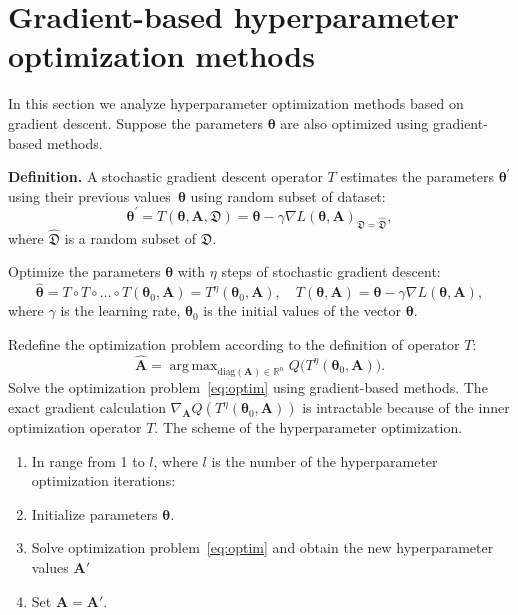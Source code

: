 \documentclass[12pt]{article}
\DeclareMathOperator*{\argmax}{arg\,max}
\begin{document}
\section{Gradient-based hyperparameter optimization methods}
In this section we analyze hyperparameter optimization methods based on gradient descent. Suppose the parameters $\boldsymbol{\theta}$ are also optimized using gradient-based methods. 

\textbf{Definition.} A stochastic gradient descent operator $T$ estimates the parameters $\boldsymbol{\theta}^\prime$ using their previous values~$\boldsymbol{\theta}$ using random subset of dataset:
\[
	\boldsymbol{\theta}^\prime = T(\boldsymbol{\theta}, \mathbf{A}, \mathfrak{D}) = \boldsymbol{\theta} - \gamma \nabla L(\boldsymbol{\theta}, \mathbf{A})_{\mathfrak{D} = \hat{\mathfrak{D}}},
\]
where $\hat{\mathfrak{D}}$ is a random subset of $\mathfrak{D}$.

Optimize the parameters  $\boldsymbol{\theta}$ with $\eta$ steps of stochastic gradient descent:
\begin{equation}
\label{eq:gd}
	 \hat{\boldsymbol{\theta}} = T \circ T \circ \dots \circ T(\boldsymbol{\theta}_0, \mathbf{A}) = T^\eta(\boldsymbol{\theta}_0, \mathbf{A}), \quad 	T(\boldsymbol{\theta}, \mathbf{A}) =\boldsymbol{\theta} - \gamma \nabla L(\boldsymbol{\theta}, \mathbf{A}), 
\end{equation}
where $\gamma$ is the learning rate, $\boldsymbol{\theta}_0$ is the initial values of the vector $\boldsymbol{\theta}$. 

Redefine the optimization problem according to the definition of operator $T$:
\begin{equation}
\label{eq:optim}
	\hat{\mathbf{A}} = \argmax_{\text{diag}(\mathbf{A}) \in \mathbb{R}^n} Q\bigl( T^\eta(\boldsymbol{\theta}_0, \mathbf{A})\bigr).
\end{equation}
Solve the optimization problem~\eqref{eq:optim} using gradient-based methods. The exact gradient calculation $\nabla_{\mathbf{A}} Q( T^\eta(\boldsymbol{\theta}_0, \mathbf{A}))$ is intractable because of the inner optimization operator $T$. The scheme of the hyperparameter optimization.
\begin{enumerate}
\item In range from 1 to  $l$, where $l$ is the number of the hyperparameter optimization iterations:
\item Initialize parameters $\boldsymbol{\theta}$.
\item Solve optimization problem~\eqref{eq:optim} and obtain the new hyperparameter values $\mathbf{A}'$
\item Set $\mathbf{A} = \mathbf{A}'$.
\end{enumerate}
\end{document}
